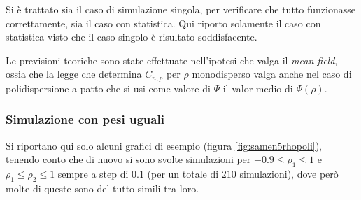\documentclass[a4paper,12pt,twoside,openright]{report}
\begin{document}
Si è trattato sia il caso di simulazione singola, per verificare che tutto funzionasse correttamente, sia il caso con statistica. Qui riporto solamente il caso con statistica visto che il caso singolo è risultato soddisfacente.

Le previsioni teoriche sono state effettuate nell'ipotesi che valga il \emph{mean-field}, ossia che la legge che determina $C_{n,p}$ per $\rho$ monodisperso valga anche nel caso di polidispersione a patto che si usi come valore di $\Psi$ il valor medio di $\Psi(\rho)$.

\subsubsection{Simulazione con pesi uguali}
\label{subsubsec:5dimrhopolisame}
Si riportano qui solo alcuni grafici di esempio (figura \ref{fig:samen5rhopoli}), tenendo conto che di nuovo si sono svolte simulazioni per $ -0.9 \le \rho_1 \le 1 $ e $ \rho_1 \le \rho_2 \le 1 $ sempre a step di $0.1$ (per un totale di $210$ simulazioni), dove però molte di queste sono del tutto simili tra loro.
\end{document}
